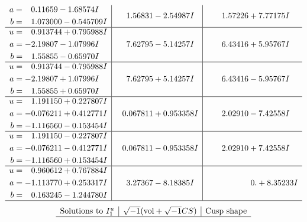 \documentclass[1p]{elsarticle_modified}
\theoremstyle{definition}
\newcommand{\I}{\sqrt{-1}}
\begin{document}
$$\begin{array}{c|c|c}
\begin{aligned}
a &= \phantom{-}0.11659 - 1.68574 I \\
b &= \phantom{-}1.073000 - 0.545709 I\end{aligned}
 & \phantom{-}1.56831 - 2.54987 I & \phantom{-}1.57226 + 7.77175 I \\ \hline\begin{aligned}
u &= \phantom{-}0.913744 + 0.795988 I \\
a &= -2.19807 - 1.07996 I \\
b &= \phantom{-}1.55855 - 0.65970 I\end{aligned}
 & \phantom{-}7.62795 - 5.14257 I & \phantom{-}6.43416 + 5.95767 I \\ \hline\begin{aligned}
u &= \phantom{-}0.913744 - 0.795988 I \\
a &= -2.19807 + 1.07996 I \\
b &= \phantom{-}1.55855 + 0.65970 I\end{aligned}
 & \phantom{-}7.62795 + 5.14257 I & \phantom{-}6.43416 - 5.95767 I \\ \hline\begin{aligned}
u &= \phantom{-}1.191150 + 0.227807 I \\
a &= -0.076211 + 0.412771 I \\
b &= -1.116560 - 0.153454 I\end{aligned}
 & \phantom{-}0.067811 + 0.953358 I & \phantom{-}2.02910 - 7.42558 I \\ \hline\begin{aligned}
u &= \phantom{-}1.191150 - 0.227807 I \\
a &= -0.076211 - 0.412771 I \\
b &= -1.116560 + 0.153454 I\end{aligned}
 & \phantom{-}0.067811 - 0.953358 I & \phantom{-}2.02910 + 7.42558 I \\ \hline\begin{aligned}
u &= \phantom{-}0.960612 + 0.767884 I \\
a &= -1.113770 + 0.253317 I \\
b &= \phantom{-}0.163245 - 1.244780 I\end{aligned}
 & \phantom{-}3.27367 - 8.18385 I & \phantom{-0.000000 -}0. + 8.35233 I\\
 \hline 
 \end{array}$$\newpage$$\begin{array}{c|c|c}  
\text{Solutions to }I^u_{1}& \I (\text{vol} + \sqrt{-1}CS) & \text{Cusp shape}\\
 \hline 

\end{array}$$
\end{document}
